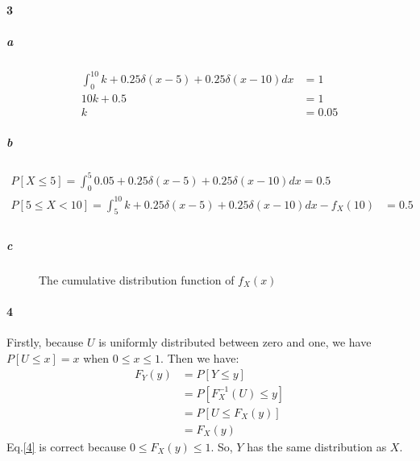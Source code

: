 \documentclass[22pt]{article}
\begin{document}
	\paragraph{3}
		\subparagraph{a}
		\begin{align}
			\int_0^{10} k + 0.25 \delta(x-5) + 0.25 \delta(x-10) dx &= 1\\
			10k + 0.5 & = 1\\ 
			k & = 0.05
		\end{align}
		\subparagraph{b} 
						\begin{align}
						P[X\leq	5] = \int_0^{5} 0.05 + 0.25 \delta(x-5) + 0.25 \delta(x-10) dx  = 0.5\\
						P[5\leq X <10]=\int_5^{10} k + 0.25 \delta(x-5) + 0.25 \delta(x-10) dx -f_X(10)&= 0.5\\
						\end{align}
		\subparagraph{c}\begin{figure}[H]
				\centering
				\caption{The cumulative distribution function of $f_X(x)$} 
			\end{figure}


		\paragraph{4} Firstly, because $U$ is uniformly distributed between zero and one, we have $P[U\leq x] = x$ when $0\leq x \leq 1$.
		Then we have:
		\begin{align}
		F_Y(y) & = P[Y\leq y]\\
		& = P[F_X^{-1}(U)\leq y]\\
		& = P[U\leq F_X(y)]\\
		& = F_X(y) \label{4}
		\end{align}
		Eq.\ref{4} is correct because $0\leq F_X(y) \leq 1$. So, $Y$ has the same distribution as $X$.
\end{document}
